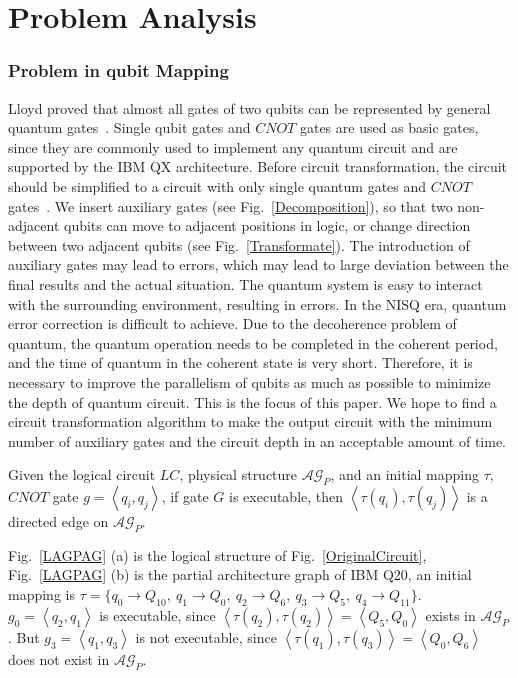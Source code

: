 \documentclass[runningheads]{llncs}
\begin{document}
\section{Problem Analysis}
\label{Problem Analysis}

\subsubsection{Problem in qubit Mapping}
Lloyd proved that almost all gates of two qubits can be represented by general quantum gates~\cite{Lloyd1995Almost}. 
Single qubit gates and $CNOT$ gates are used as basic gates, 
since they are commonly used to implement any quantum circuit 
and are supported by the IBM QX architecture.
Before circuit transformation, the circuit should be simplified to a circuit with only single 
quantum gates and $CNOT$ gates~\cite{2005Mttnen,1995Barenco}.
We insert 
auxiliary gates (see Fig.~\ref{Decomposition}),
so that two non-adjacent qubits can move to adjacent positions in logic, 
or change direction between two adjacent qubits (see Fig.~\ref{Transformate}). 
The introduction of auxiliary gates may lead to errors, 
which may lead to large deviation between the final results and the actual situation. 
The quantum system is easy to interact with the surrounding environment, 
resulting in errors. In the NISQ era, quantum error correction is difficult to achieve. 
Due to the decoherence problem of quantum, the quantum operation needs to be completed in the coherent period, 
and the time of quantum in the coherent state is very short. Therefore, 
it is necessary to improve the parallelism of qubits as much as possible to minimize the depth of quantum circuit. This is the focus of this paper. We hope to find a circuit transformation algorithm to make the output circuit 
with the minimum number of auxiliary gates and the circuit depth in an acceptable amount of time.

Given the logical circuit $LC$, physical structure $\mathcal{AG}_{P}$, 
and an initial mapping $\tau$, $CNOT$ gate $g=\left \langle q_{i},q_{j}\right \rangle $, 
if gate $G$ is executable, then $\left \langle\tau(q_{i}),\tau(q_{j})\right \rangle $ 
is a directed edge on $\mathcal{AG}_{P}$.

\begin{example}
	Fig.~\ref{LAGPAG} (a) is the logical structure of Fig.~\ref{OriginalCircuit}, 
	Fig.~\ref{LAGPAG} (b) is the partial architecture graph of IBM Q20, an initial mapping is 
	$\tau=\{q_{0}\rightarrow  Q_{10},\ q_{1}\rightarrow Q_{0},\ 
	q_{2}\rightarrow  Q_{6},\ q_{3}\rightarrow  Q_{5},\ q_{4}\rightarrow  Q_{11}\}$.
	$g_{0}=\left \langle q_{2},q_{1}\right \rangle $ is executable, since 
	$\left \langle \tau(q_{2}),\tau(q_{2})\right \rangle =\left \langle Q_{5},Q_{0}\right \rangle $ exists in $\mathcal{AG}_{P}$.
	But $g_{3}=\left \langle q_{1},q_{3}\right \rangle $ is not executable, since 
	$\left \langle \tau(q_{1}),\tau(q_{3})\right \rangle =\left \langle Q_{0},Q_{6}\right \rangle $  does not exist in $\mathcal{AG}_{P}$.
\end{example}
\end{document}

